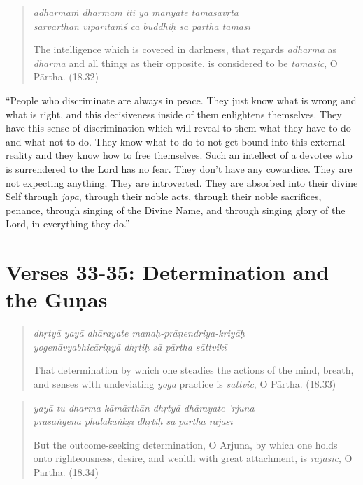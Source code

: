 \documentclass[12pt, twoside, openright]{memoir}
\begin{document}
\par
\begin{verse}
\textit{adharmaṁ dharmam iti yā manyate tamasāvṛtā} \\
\textit{sarvārthān viparītāṁś ca buddhiḥ sā pārtha tāmasī}

\noindent The intelligence which is covered in darkness, that regards \textit{adharma} as \textit{dharma} and all things as their opposite, is considered to be \textit{tamasic}, O Pārtha. (18.32)
\end{verse}
\par


\enquote{People who discriminate are always in peace. They just know what is wrong and what is right, and this decisiveness inside of them enlightens themselves. They have this sense of discrimination which will reveal to them what they have to do and what not to do. They know what to do to not get bound into this external reality and they know how to free themselves. Such an intellect of a devotee who is surrendered to the Lord has no fear. They don’t have any cowardice. They are not expecting anything. They are introverted. They are absorbed into their divine Self through \textit{japa}, through their noble acts, through their noble sacrifices, penance, through singing of the Divine Name, and through singing glory of the Lord, in everything they do.}

\section{Verses 33-35: Determination and the Guṇas}\label{sec-verses-33-35-determination-and-the-gunas}


\par
\begin{verse}
\textit{dhṛtyā yayā dhārayate manaḥ-prāṇendriya-kriyāḥ} \\
\textit{yogenāvyabhicāriṇyā dhṛtiḥ sā pārtha sāttvikī}

\noindent That determination by which one steadies the actions of the mind, breath, and senses with undeviating \textit{yoga} practice is \textit{sattvic}, O Pārtha. (18.33)
\end{verse}
\par




\par
\begin{verse}
\textit{yayā tu dharma-kāmārthān dhṛtyā dhārayate ’rjuna} \\
\textit{prasaṅgena phalākāṅkṣī dhṛtiḥ sā pārtha rājasī}

\noindent But the outcome-seeking determination, O Arjuna, by which one holds onto righteousness, desire, and wealth with great attachment, is \textit{rajasic}, O Pārtha. (18.34)
\end{verse}
\par
\end{document}
